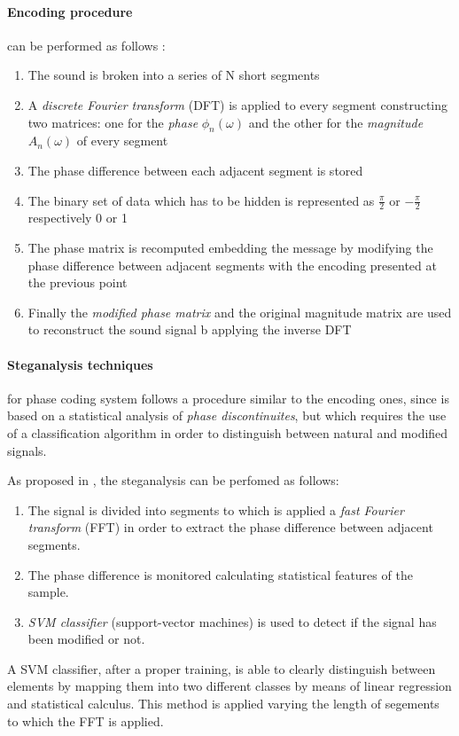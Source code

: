 \documentclass[../../main.tex]{subfiles}
\begin{document}
    \paragraph{Encoding procedure} can be performed as follows
    \cite{techniques-data-hiding}:
    \begin{enumerate}
        \item The sound is broken into a series of N short segments
        \item A \emph{discrete Fourier transform} (DFT) is applied to every
            segment constructing two matrices: one for the \emph{phase}
            $\phi_n(\omega)$ and the other for the \emph{magnitude}
            $A_n(\omega)$ of every segment
        \item The phase difference between each adjacent segment is stored
        \item The binary set of data which has to be hidden is represented as
            $\frac{\pi}{2}$ or $-\frac{\pi}{2}$ respectively 0 or 1
        \item The phase matrix is recomputed embedding the message by modifying
            the phase difference between adjacent segments with the encoding
            presented at the previous point
        \item Finally the \emph{modified phase matrix} and the original
            magnitude matrix are used to reconstruct the sound signal b
            applying the inverse DFT
    \end{enumerate}

    \paragraph{Steganalysis techniques} for phase coding system follows a
    procedure similar to the encoding ones, since is based on a statistical
    analysis of \emph{phase discontinuites}, but which requires the use of a
    classification algorithm in order to distinguish between natural and
    modified signals.
    
    As proposed in \cite{steganalysis-phase-coding}, the steganalysis can be
    perfomed as follows:
    \begin{enumerate}
        \item The signal is divided into segments to which is applied a
            \emph{fast Fourier transform} (FFT) in order to extract the phase
            difference between adjacent segments.
        \item The phase difference is monitored calculating statistical features
            of the sample.
        \item \emph{SVM classifier} (support-vector machines) is used to
            detect if the signal has been modified or not.
    \end{enumerate}
    A SVM classifier, after a proper training, is able to clearly distinguish
    between elements by mapping them into two different classes by means of
    linear regression and statistical calculus.
    This method is applied varying the length of segements to which the FFT is
    applied.
\end{document}
